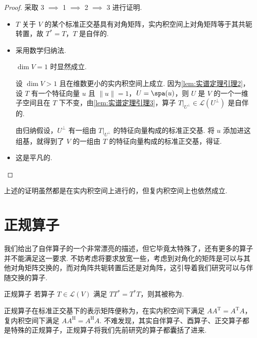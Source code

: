 \begin{proof}
    采取 3 $\implies$ 1 $\implies$ 2 $\implies$ 3 进行证明.

    \begin{itemize}
        \item[\ref*{item:24:实谱定理:3}$\implies$\ref*{item:24:实谱定理:1}] $ T $ 关于 $ V $ 的某个标准正交基具有对角矩阵，实内积空间上对角矩阵等于其共轭转置，故 $ T^* = T $，$ T $ 是自伴的.

        \item[\ref*{item:24:实谱定理:1}$\implies$\ref*{item:24:实谱定理:2}] 采用数学归纳法.

              $ \dim V = 1 $ 时显然成立.

              设 $ \dim V > 1 $ 且在维数更小的实内积空间上成立. 因为\autoref{lem:实谱定理引理2}，设 $ T $ 有一个特征向量 $ u $ 且 $ \lVert u \rVert = 1 $，$ U = \spa(u) $，则 $ U $ 是 $ V $ 的一个一维子空间且在 $ T $ 下不变，由\autoref{lem:实谱定理引理3}，算子 $ T|_{U^{\perp }} \in \mathcal{L}(U^{\perp }) $ 是自伴的.

              由归纳假设，$ U^{\perp } $ 有一组由 $ T|_{U^{\perp }} $ 的特征向量构成的标准正交基. 将 $ u $ 添加进这组基，就得到了 $ V $ 的一组由 $ T $ 的特征向量构成的标准正交基，得证.

        \item[\ref*{item:24:实谱定理:2}$\implies$\ref*{item:24:实谱定理:3}] 这是平凡的.
    \end{itemize}
\end{proof}

上述的证明虽然都是在实内积空间上进行的，但复内积空间上也依然成立.


\section{正规算子}

我们给出了自伴算子的一个非常漂亮的描述，但它毕竟太特殊了，还有更多的算子并不能满足这一要求. 不妨考虑将要求放宽一些，考虑到对角化的矩阵是可以与其他对角矩阵交换的，而对角阵共轭转置后还是对角阵，这引导着我们研究可以与伴随交换的算子.

\begin{definition}{正规算子}{} 
    若算子 $ T \in \mathcal{L}(V) $ 满足 $ TT^* = T^*T $，则其被称为.
\end{definition}

正规算子在标准正交基下的表示矩阵便称为，在实内积空间下满足 $ AA^{\mathrm{T}} = A^{\mathrm{T}}A $，复内积空间下满足 $ AA^{\mathrm{H}} = A^{\mathrm{H}}A $. 不难发现，其实自伴算子、酉算子、正交算子都是特殊的正规算子，正规算子将我们先前研究的算子都囊括了进来.

